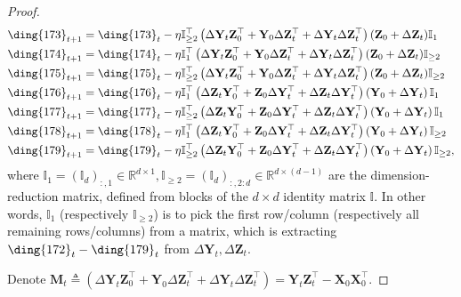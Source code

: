 \documentclass{article}
\theoremstyle{plain}
\theoremstyle{remark}
\def\R{\mathbb{R}}
\def\bX{\mathbf{X}}
\def\bY{\mathbf{Y}}
\def\bZ{\mathbf{Z}}
\newcommand{\cc}[1]{\text{\ding{\number\numexpr#1 + 171\relax}}}
\begin{document}
\begin{proof}
\begin{align}
        \cc{2}_{t+1} &= \cc{2}_t-\eta\mathbb{I}_{\ge 2}^\top\left(\Delta \bY_t \bZ_0^\top + \bY_0 \Delta\bZ_t^\top + \Delta\bY_t\Delta\bZ_t^\top\right)(\bZ_0+\Delta\bZ_t)\mathbb{I}_1 \\
        \cc{3}_{t+1} &= \cc{3}_t-\eta\mathbb{I}_{1}^\top\left(\Delta \bY_t \bZ_0^\top + \bY_0 \Delta\bZ_t^\top + \Delta\bY_t\Delta\bZ_t^\top\right)(\bZ_0+\Delta\bZ_t)\mathbb{I}_{\ge 2} \\
        \cc{4}_{t+1} &= \cc{4}_t-\eta\mathbb{I}_{\ge 2}^\top\left(\Delta \bY_t \bZ_0^\top + \bY_0 \Delta\bZ_t^\top + \Delta\bY_t\Delta\bZ_t^\top\right)(\bZ_0+\Delta\bZ_t)\mathbb{I}_{\ge 2} \\
        \cc{5}_{t+1} &= \cc{5}_t-\eta\mathbb{I}_1^\top\left(\Delta\bZ_t\bY_0^\top + \bZ_0\Delta\bY_t^\top + \Delta\bZ_t\Delta\bY_t^\top\right)\left(\bY_0+\Delta\bY_t\right)\mathbb{I}_1 \\
        \cc{6}_{t+1} &= \cc{6}_t-\eta\mathbb{I}_{\ge 2}^\top\left(\Delta\bZ_t\bY_0^\top + \bZ_0\Delta\bY_t^\top + \Delta\bZ_t\Delta\bY_t^\top\right)\left(\bY_0+\Delta\bY_t\right)\mathbb{I}_1 \\
        \cc{7}_{t+1} &= \cc{7}_t-\eta\mathbb{I}_{1}^\top\left(\Delta\bZ_t\bY_0^\top + \bZ_0\Delta\bY_t^\top + \Delta\bZ_t\Delta\bY_t^\top\right)\left(\bY_0+\Delta\bY_t\right)\mathbb{I}_{\ge 2} \\
        \cc{8}_{t+1} &= \cc{8}_t-\eta\mathbb{I}_{\ge 2}^\top\left(\Delta\bZ_t\bY_0^\top + \bZ_0\Delta\bY_t^\top + \Delta\bZ_t\Delta\bY_t^\top\right)\left(\bY_0+\Delta\bY_t\right)\mathbb{I}_{\ge 2},
    \end{align}
    where $\mathbb{I}_1=(\mathbb{I}_{d})_{:,1}\in\R^{d\times 1}, \mathbb{I}_{\ge 2}=(\mathbb{I}_d)_{:,2:d}\in\R^{d\times(d-1)}$ are the dimension-reduction matrix, defined from blocks of the $d\times d$ identity matrix $\mathbb{I}$. In other words, $\mathbb{I}_1$ (respectively $\mathbb{I}_{\ge2}$) is to pick the first row/column (respectively all remaining rows/columns) from a matrix, which is extracting $\cc{1}_t - \cc{8}_t$ from $\Delta\bY_t,\Delta\bZ_t$.

    Denote $\mathbf{M}_t\triangleq \left(\Delta \bY_{t} \bZ_0^\top + \bY_0 \Delta\bZ_{t}^\top + \Delta\bY_{t}\Delta\bZ_{t}^\top\right)=\bY_t\bZ_t^\top-\bX_0\bX_0^\top$.


\end{proof}
\end{document}
